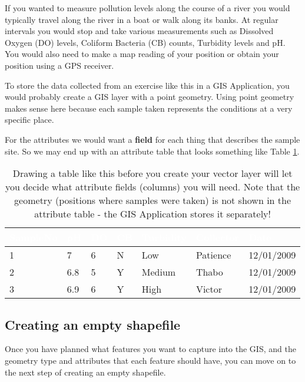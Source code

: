 If you wanted to measure pollution levels along the course of a river you
would typically travel along the river in a boat or walk along its banks. At
regular intervals you would stop and take various measurements such as
Dissolved Oxygen (DO) levels, Coliform Bacteria (CB) counts, Turbidity levels
and pH. You would also need to make a map reading of your position or obtain
your position using a GPS receiver.

To store the data collected from an exercise like this in a GIS Application,
you would probably create a GIS layer with a point geometry. Using point
geometry makes sense here because each sample taken represents the conditions
at a very specific place.

For the attributes we would want a \textbf{field} for each thing that describes the
sample site. So we may end up with an attribute table that looks something
like Table \ref{tab:attrtable}.

\begin{table}[ht]
\centering
\caption{Drawing a table like this before you create your vector layer will
let you decide what attribute fields (columns) you will need. Note that the
geometry (positions where samples were taken) is not shown in the attribute
table - the GIS Application stores it separately!}\medskip
 \label{tab:attrtable}
 \begin{tabular}{|p{2.3cm}|p{1cm}|p{1cm}|p{1cm}|p{2.3cm}|p{2.3cm}|p{2.3cm}|}
 \hline
 \rowcolor{black}
 \textcolor{white}{\textbf{SampleNo}} &
 \textcolor{white}{\textbf{pH}} &
 \textcolor{white}{\textbf{DO}} &
 \textcolor{white}{\textbf{CB}} &
 \textcolor{white}{\textbf{Turbidity}} &
 \textcolor{white}{\textbf{Collector}} &
 \textcolor{white}{\textbf{Date}} \\
 \hline 1 & 7 & 6 & N & Low & Patience & 12/01/2009 \\
 \hline 2 & 6.8 & 5 & Y & Medium & Thabo & 12/01/2009 \\
 \hline 3 & 6.9 & 6 & Y & High & Victor & 12/01/2009 \\
\hline
\end{tabular}
\end{table}

\subsection{Creating an empty shapefile}

Once you have planned what features you want to capture into the GIS, and the
geometry type and attributes that each feature should have, you can move on
to the next step of creating an empty shapefile. 

